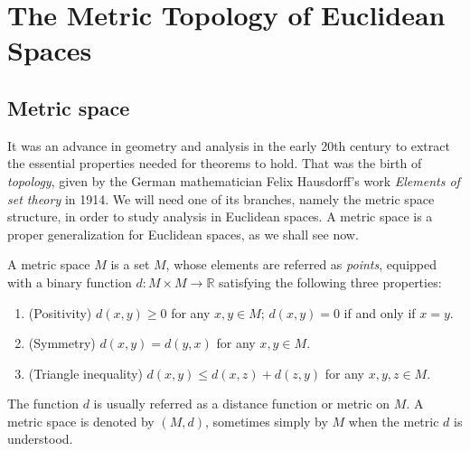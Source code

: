 \chapter{The Metric Topology of Euclidean Spaces}
\label{chap:metric_of_rn}

\section{Metric space}
\label{sec:metric}

It was an advance in geometry and analysis in the early 20th century to extract the essential properties needed for theorems to hold.
That was the birth of \emph{topology}, given by the German mathematician Felix Hausdorff's work \emph{Elements of set theory} in 1914.
We will need one of its branches, namely the metric space structure, in order to study analysis in Euclidean spaces.
A metric space is a proper generalization for Euclidean spaces, as we shall see now.

\begin{defn}
  A \textsf{metric space} $M$ is a set $M$, whose elements are referred as \emph{points}, equipped with a binary function $d: M \times M \to \mathbb{R}$ satisfying the following three properties:
  \begin{enumerate}[(1)]
    \item (Positivity) $d(x,y) \geqslant 0$ for any $x,y \in M$; $d(x,y) = 0$ if and only if $x=y$.
    \item (Symmetry) $d(x,y) = d(y,x)$ for any $x,y\in M$.
    \item (Triangle inequality) $d(x,y) \leqslant d(x,z) + d(z,y)$ for any $x, y, z \in M$.
  \end{enumerate}
  The function $d$ is usually referred as a \textsf{distance function} or \textsf{metric} on $M$.
  A metric space is denoted by $(M,d)$, sometimes simply by $M$ when the metric $d$ is understood.
\end{defn}


